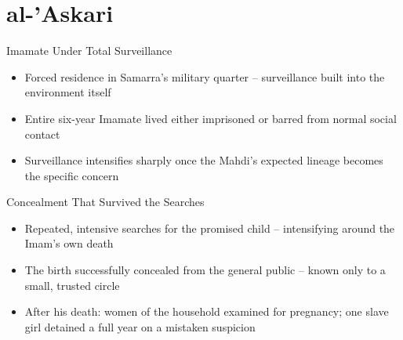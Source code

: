 \section{al-'Askari}

\begin{frame}{Imamate Under Total Surveillance}
\begin{itemize}[itemsep=5pt]
  \item Forced residence in Samarra's military quarter -- surveillance built into the environment itself
  \item Entire six-year Imamate lived either imprisoned or barred from normal social contact
  \item Surveillance intensifies sharply once the Mahdi's expected lineage becomes the specific concern
\end{itemize}
\end{frame}

\begin{frame}{Concealment That Survived the Searches}
\begin{itemize}[itemsep=5pt]
  \item Repeated, intensive searches for the promised child -- intensifying around the Imam's own death
  \item The birth successfully concealed from the general public -- known only to a small, trusted circle
  \item After his death: women of the household examined for pregnancy; one slave girl detained a full year on a mistaken suspicion
\end{itemize}
\end{frame}

